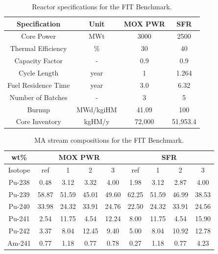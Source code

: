 \documentclass{article}
\begin{document}
\begin{table}[htbp!]
    \centering
    \begin{tabular}{cccc}
        \hline
        Specification & Unit & \gls{MOX} \gls{PWR} & \gls{SFR} \\
        \hline
        Core Power & MWt & 3000 & 2500 \\
        Thermal Efficiency & \% & 30 & 40\\
        Capacity Factor & - & 0.9 & 0.9\\
        Cycle Length & year & 1 & 1.264\\
        Fuel Residence Time & year & 3.0 & 6.32 \\
        Number of Batches & - & 3 & 5\\
        Burnup & MWd/kgiHM & 41.09 & 100\\
        Core Inventory & kgHM/y & 72,000 & 51,953.4 \\
        \hline
    \end{tabular}
    \caption{Reactor specifications for the \gls{FIT} Benchmark.}
    \label{tab:reac}
\end{table}


\begin{table}[htbp!]
    \centering
    \begin{tabular}{c|cccc|cccc}
        \hline
        wt\% & \multicolumn{4}{c|}{\gls{MOX} \gls{PWR}} & \multicolumn{4}{c}{\gls{SFR}} \\
        \hline
        Isotope & ref & 1 & 2 & 3 & ref & 1 & 2 & 3 \\
        \hline
        Pu-238 &  0.48 & 3.12 & 3.32 & 4.00 & 1.98 & 3.12 & 2.87 & 4.00\\
        Pu-239 & 58.87 & 51.59 & 45.01 & 49.60 & 62.25 & 51.59 & 46.99 & 38.53 \\
        Pu-240 & 33.98 & 24.32 & 33.91 & 24.76 & 22.50 & 24.32 & 33.91 & 24.56 \\
        Pu-241 & 2.54 & 11.75 & 4.54 & 12.24 & 8.00 & 11.75 & 4.54 & 15.90 \\
        Pu-242 & 3.37 & 8.04 & 12.45 & 9.40 & 5.00 & 8.04 & 10.92 & 12.78 \\
        Am-241 & 0.77 & 1.18 & 0.77 & 0.78 & 0.27 & 1.18 & 0.77 & 4.23 \\
        \hline
    \end{tabular}
    \caption{\gls{MA} stream compositions for the \gls{FIT} Benchmark.}
    \label{tab:pu}
\end{table}
\end{document}
